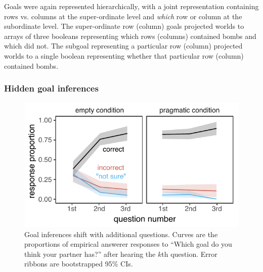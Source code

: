 \documentclass[11pt, floatsintext]{apa6}
\begin{document}
Goals were again represented hierarchically, with a joint representation containing rows vs. columns at the super-ordinate level and \emph{which} row or column at the subordinate level.
The super-ordinate row (column) goals projected worlds to arrays of three booleans representing which rows (columns) contained bombs and which did not.
The subgoal representing a particular row (column) projected worlds to a single boolean representing whether that particular row (column) contained bombs.

\subsubsection{Hidden goal inferences}


\begin{figure}[t!]
\begin{center}
\includegraphics[scale = .8]{Exp3/spatialGoalInference_final.pdf}
\end{center}
\caption{Goal inferences shift with additional questions. Curves are the proportions of empirical answerer responses to ``Which goal do you think your partner has?''  after hearing the $k$th question. Error ribbons are bootstrapped 95\% CIs.}
\label{fig:exp3goalinference}
\end{figure}
\end{document}

